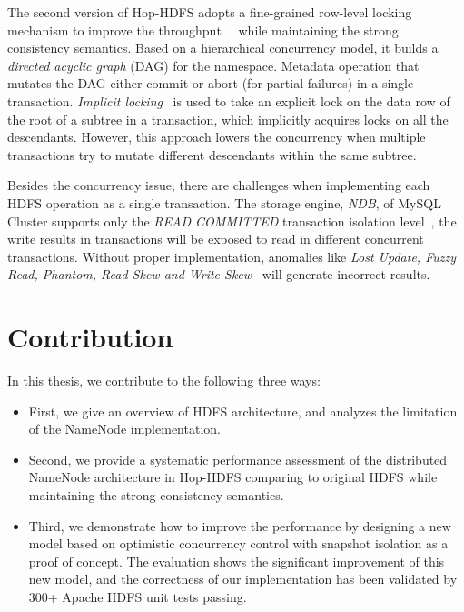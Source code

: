 \noindent The second version of Hop-HDFS adopts a fine-grained row-level locking mechanism to improve the throughput~\cite{hakimzadeh2014scaling}~\cite{peiro2013maintaining} while maintaining the strong consistency semantics. Based on a hierarchical concurrency model, it builds a \textit{directed acyclic graph} (DAG) for the namespace. Metadata operation that mutates the DAG either commit or abort (for partial failures) in a single transaction. \textit{Implicit locking}~\cite{gray1976granularity} is used to take an explicit lock on the data row of the root of a subtree in a transaction, which implicitly acquires locks on all the descendants. However, this approach lowers the concurrency when multiple transactions try to mutate different descendants within the same subtree.

\noindent Besides the concurrency issue, there are challenges when implementing each HDFS operation as a single transaction. The storage engine, \textit{NDB}, of MySQL Cluster supports only the \textit{READ COMMITTED} transaction isolation level~\cite{ndblimits}, the write results in transactions will be exposed to read in different concurrent transactions. Without proper implementation, anomalies like \textit{Lost Update, Fuzzy Read, Phantom, Read Skew and Write Skew}~\cite{berenson1995critique} will generate incorrect results.


\section{Contribution}

In this thesis, we contribute to the following three ways:

\begin{itemize}
	\item First, we give an overview of HDFS architecture, and analyzes the limitation of the NameNode implementation.
	\item Second, we provide a systematic performance assessment of the distributed NameNode architecture in Hop-HDFS comparing to original HDFS while maintaining the strong consistency semantics.
	\item Third, we demonstrate how to improve the performance by designing a new model based on optimistic concurrency control with snapshot isolation as a proof of concept. The evaluation shows the significant improvement of this new model, and the correctness of our implementation has been validated by 300+ Apache HDFS unit tests passing.
\end{itemize}

